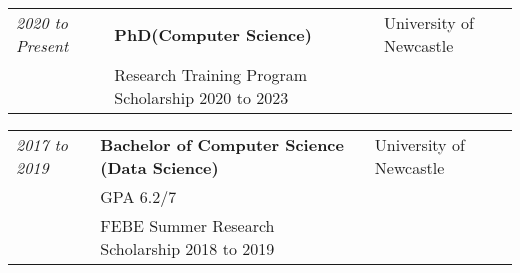 \documentclass{myresume}
\begin{document}

        \begin{tabularx}{\textwidth}{ >{\hsize=0.25\hsize}X  >{\hsize=0.5\hsize}X >{\hsize=0.25\hsize}X }
                \textit{2020 to Present} & \textbf{PhD(Computer Science)} & University of Newcastle \\
            & Research Training Program Scholarship 2020 to 2023 & \\
        \end{tabularx}

        \begin{tabularx}{\textwidth}{ >{\hsize=0.25\hsize}X  >{\hsize=0.5\hsize}X >{\hsize=0.25\hsize}X }
            \textit{2017 to 2019} & \textbf{Bachelor of Computer Science (Data Science)} & University of Newcastle \\
            & GPA 6.2/7 & \\
            & FEBE Summer Research Scholarship 2018 to 2019 & \\
        \end{tabularx}
\end{document}
